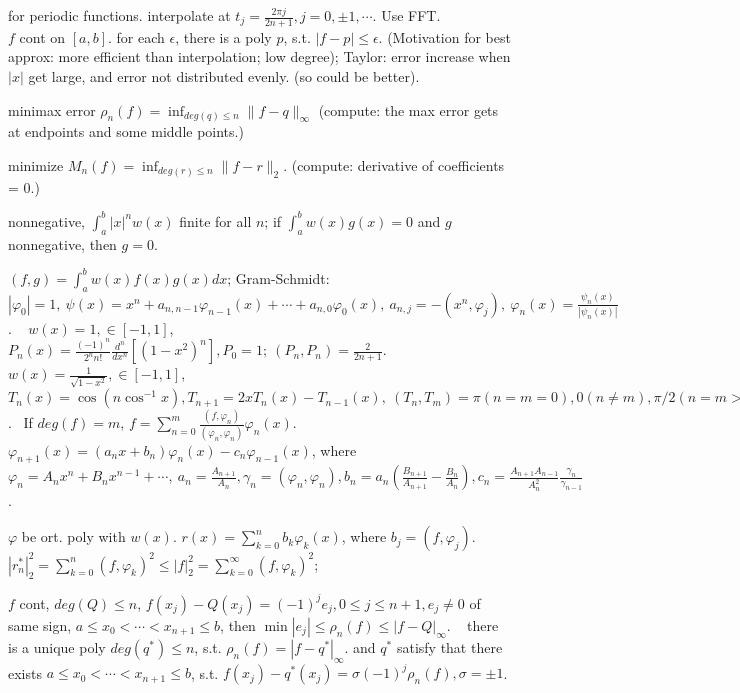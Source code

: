  for periodic functions. interpolate at $t_{j} = \frac{2\pi j}{2n+1}, j = 0, \pm 1,\cdots$. Use FFT. \\[5pt]

 $f$ cont on $[a, b]$. for each $\epsilon$, there is a poly $p$, s.t. $|f-p|\le\epsilon$. (Motivation for best approx: more efficient than interpolation; low degree); Taylor: error increase when $|x|$ get large, and error not distributed evenly. (so could be better).

 minimax error $\rho_n(f) = \inf_{deg(q)\le n}\lVert f-q\rVert_{\infty} $ (compute: the max error gets at endpoints and some middle points.)

 minimize $M_n(f) = \inf_{deg(r)\le n}\lVert f-r\rVert_2 $. (compute: derivative of coefficients = 0.)

 nonnegative, $\int_{a}^{b}|x|^nw(x) $ finite for all $n$; if $\int_{a}^{b}w(x)g(x) = 0 $ and $g$ nonnegative, then $g = 0$.

 $(f, g) = \int_{a}^{b}w(x)f(x)g(x)dx $; Gram-Schmidt: $|\varphi_0| = 1, ~\psi(x) = x^n+a_{n,n-1}\varphi_{n-1}(x)+\cdots+a_{n, 0}\varphi_0(x), ~a_{n, j} = -(x^n, \varphi_j), ~\varphi_n(x) = \frac{\psi_n(x)}{|\psi_n(x)|} $. ~ $w(x) = 1, \in[-1, 1]$, $P_n(x) = \frac{(-1)^n}{2^nn!}\frac{d^n}{dx^n}[(1-x^2)^n], P_0 = 1; ~(P_n, P_n) = \frac{2}{2n+1} $. ~ $w(x) = \frac{1}{\sqrt{1-x^2}}, \in[-1, 1]$, $T_n(x) = \cos(n\cos^{-1}x), T_{n+1} = 2xT_n(x)-T_{n-1}(x), ~(T_n, T_m) = \pi(n=m=0), 0(n\ne m), \pi/2(n=m>0) $. ~If $deg(f) = m$, $f = \sum_{n=0}^{m}\frac{(f,\varphi_n)}{(\varphi_n, \varphi_n)}\varphi_n(x) $. ~ $\varphi_{n+1}(x) = (a_nx+b_n)\varphi_n(x)-c_n\varphi_{n-1}(x) $, where $\varphi_n = A_nx^n+B_nx^{n-1}+\cdots, ~a_n = \frac{A_{n+1}}{A_n}, \gamma_n = (\varphi_n, \varphi_n), b_n = a_n(\frac{B_{n+1}}{A_{n+1}}-\frac{B_n}{A_n}), c_n = \frac{A_{n+1}A_{n-1}}{A_n^2}\frac{\gamma_n}{\gamma_{n-1}}$.

 $\varphi$ be ort. poly with $w(x)$. $r(x) = \sum_{k=0}^{n}b_k\varphi_k(x) $, where $b_j = (f, \varphi_j) $. ~ $|r_n^*|_2^2 = \sum_{k=0}^{n}(f, \varphi_k)^2 \le |f|_2^2 = \sum_{k=0}^{\infty}(f, \varphi_k)^2 $;

  $f$ cont, $deg(Q)\le n$, $f(x_j)-Q(x_j) = (-1)^je_j, 0\le j\le n+1, e_j\ne 0 $ of same sign, $a\le x_0 <\cdots < x_{n+1}\le b $, then $\min|e_j| \le \rho_n(f) \le |f-Q|_\infty $. ~ there is a unique poly $deg(q^*)\le n $, s.t. $\rho_n(f) = |f-q^*|_\infty $. and $q^* $ satisfy that there exists $a\le x_0 <\cdots < x_{n+1}\le b $, s.t. $f(x_j)-q^*(x_j) = \sigma(-1)^j\rho_n(f), \sigma = \pm 1 $.

